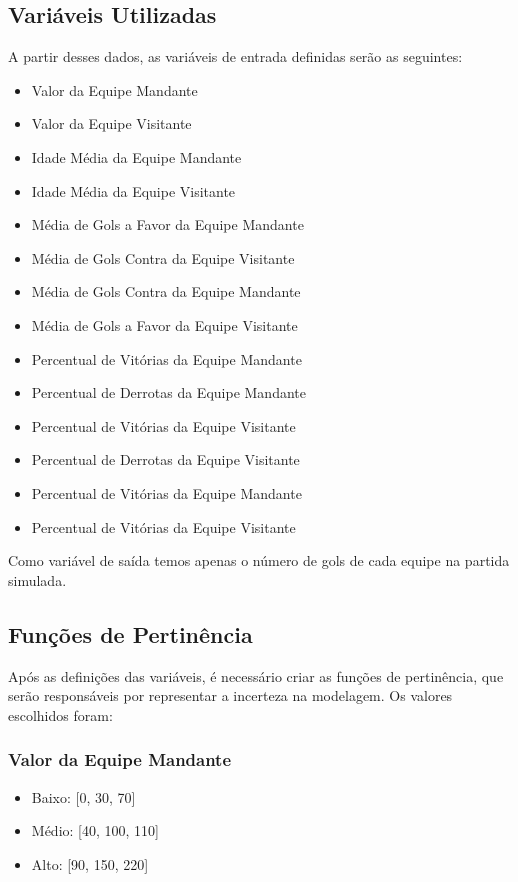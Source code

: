 \documentclass[conference]{IEEEtran}
\begin{document}
\subsection{Variáveis Utilizadas}
\indent A partir desses dados, as variáveis de entrada definidas serão as seguintes:
\begin{itemize}
    \item Valor da Equipe Mandante
    \item Valor da Equipe Visitante
    \item Idade Média da Equipe Mandante
    \item Idade Média da Equipe Visitante
    \item Média de Gols a Favor da Equipe Mandante
    \item Média de Gols Contra da Equipe Visitante
    \item Média de Gols Contra da Equipe Mandante
    \item Média de Gols a Favor da Equipe Visitante
    \item Percentual de Vitórias da Equipe Mandante
    \item Percentual de Derrotas da Equipe Mandante
    \item Percentual de Vitórias da Equipe Visitante
    \item Percentual de Derrotas da Equipe Visitante
    \item Percentual de Vitórias da Equipe Mandante
    \item Percentual de Vitórias da Equipe Visitante
\end{itemize}
Como variável de saída temos apenas o número de gols de cada equipe na partida simulada.

\subsection{Funções de Pertinência}
\indent Após as definições das variáveis, é necessário criar as funções de 
pertinência, que serão responsáveis por representar a incerteza na modelagem. Os
valores escolhidos foram:

\subsubsection{Valor da Equipe Mandante}
\begin{itemize}
    \item Baixo: [0, 30, 70]
    \item Médio: [40, 100, 110]
    \item Alto: [90, 150, 220]
\end{itemize}
\end{document}
